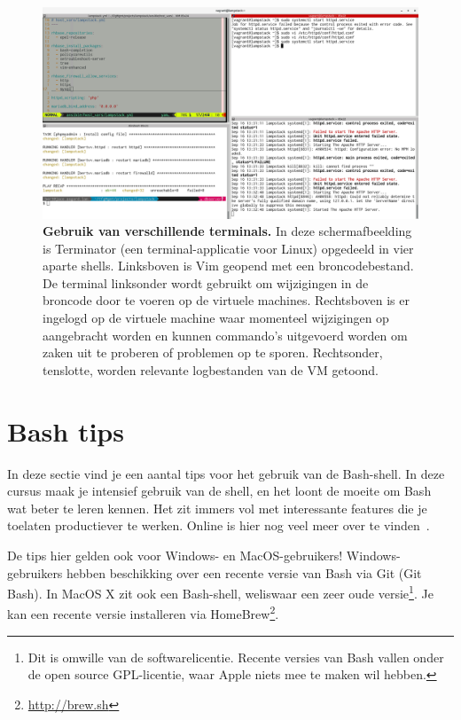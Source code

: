 \begin{figure}
  \centering
  \includegraphics[width=\linewidth]{img/screenshot-terminals}
  \caption[Gebruik van verschillende terminals.]{\textbf{Gebruik van verschillende terminals.} In deze schermafbeelding is Terminator (een terminal-applicatie voor Linux) opgedeeld in vier aparte shells. Linksboven is Vim geopend met een broncodebestand. De terminal linksonder wordt gebruikt om wijzigingen in de broncode door te voeren op de virtuele machines. Rechtsboven is er ingelogd op de virtuele machine waar momenteel wijzigingen op aangebracht worden en kunnen commando's uitgevoerd worden om zaken uit te proberen of problemen op te sporen. Rechtsonder, tenslotte, worden relevante logbestanden van de VM getoond.}
  \label{fig:screenshot-terminals}
\end{figure}

\section{Bash tips}
\label{sec:bash_tips}

In deze sectie vind je een aantal tips voor het gebruik van de Bash-shell. In deze cursus maak je intensief gebruik van de shell, en het loont de moeite om Bash wat beter te leren kennen. Het zit immers vol met interessante features die je toelaten productiever te werken. Online is hier nog veel meer over te vinden~\autocite{Rowe2009}.

De tips hier gelden ook voor Windows- en MacOS-gebruikers! Windows-gebruikers hebben beschikking over een recente versie van Bash via Git (Git Bash). In MacOS X zit ook een Bash-shell, weliswaar een zeer oude versie\footnote{Dit is omwille van de softwarelicentie. Recente versies van Bash vallen onder de open source GPL-licentie, waar Apple niets mee te maken wil hebben.}. Je kan een recente versie installeren via HomeBrew\footnote{\url{http://brew.sh}}.

